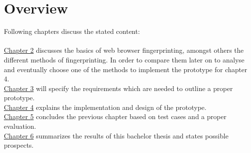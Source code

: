 \section{Overview}
Following chapters discuss the stated content:\\\\
\hyperref[cha:foundation]{Chapter 2} discusses the basics of web browser fingerprinting, amongst others the different methods of fingerprinting. In order to compare them later on to analyse and eventually choose one of the methods to implement the prototype for chapter 4.\\
\hyperref[cha:requirements]{Chapter 3} will specify the requirements which are needed to outline a proper prototype.\\
\hyperref[cha:implementation]{Chapter 4} explains the implementation and design of the prototype.\\
\hyperref[cha:evaluation]{Chapter 5} concludes the previous chapter based on test cases and a proper evaluation.\\
\hyperref[cha:summary]{Chapter 6} summarizes the results of this bachelor thesis and states possible prospects.




